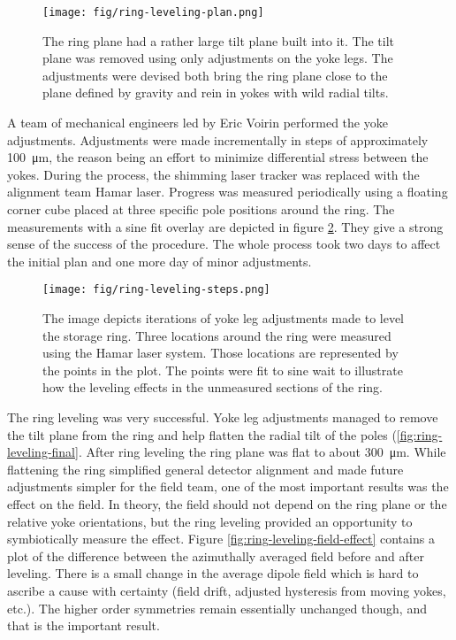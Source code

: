 \begin{figure}
\texttt{[image: fig/ring-leveling-plan.png]}
\caption{The ring plane had a rather large tilt plane built into it.  The tilt plane was removed using only adjustments on the yoke legs.  The adjustments were devised both bring the ring plane close to the plane defined by gravity and rein in yokes with wild radial tilts.}
\label{fig:ring-leveling-plan}
\end{figure}

A team of mechanical engineers led by Eric Voirin performed the yoke adjustments.  Adjustments were made incrementally in steps of approximately \SI{100}{\micro\meter}, the reason being an effort to minimize differential stress between the yokes.  During the process, the shimming laser tracker was replaced with the alignment team Hamar laser.  Progress was measured periodically using a floating corner cube placed at three specific pole positions around the ring.  The measurements with a sine fit overlay are depicted in figure \ref{fig:ring-leveling-steps}.  They give a strong sense of the success of the procedure.  The whole process took two days to affect the initial plan and one more day of minor adjustments.

\begin{figure}
\texttt{[image: fig/ring-leveling-steps.png]}
\caption{The image depicts iterations of yoke leg adjustments made to level the storage ring.  Three locations around the ring were measured using the Hamar laser system.  Those locations are represented by the points in the plot.  The points were fit to sine wait to illustrate how the leveling effects in the unmeasured sections of the ring.}
\label{fig:ring-leveling-steps}
\end{figure}

The ring leveling was very successful.  Yoke leg adjustments managed to remove the tilt plane from the ring and help flatten the radial tilt of the poles (\ref{fig:ring-leveling-final}.  After ring leveling the ring plane was flat to about \SI{300}{\micro\meter}.  While flattening the ring simplified general \gmtwo detector alignment and made future adjustments simpler for the field team, one of the most important results was the effect on the field.  In theory, the field should not depend on the ring plane or the relative yoke orientations, but the ring leveling provided an opportunity to symbiotically measure the effect.  Figure \ref{fig:ring-leveling-field-effect} contains a plot of the difference between the azimuthally averaged field before and after leveling.  There is a small change in the average dipole field which is hard to ascribe a cause with certainty (field drift, adjusted hysteresis from moving yokes, etc.).  The higher order symmetries remain essentially unchanged though, and that is the important result.

